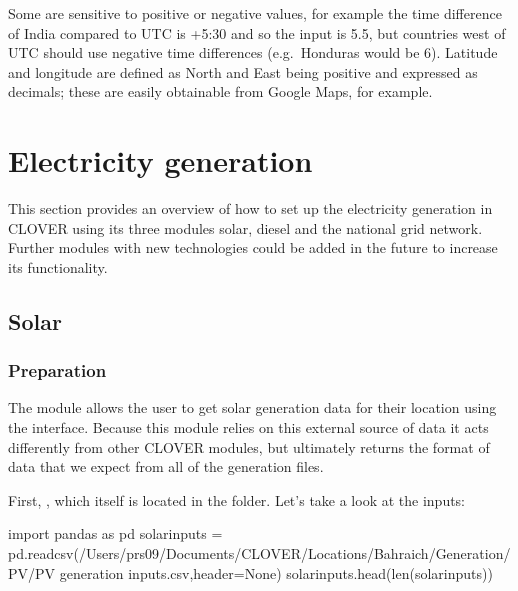 \documentclass[letterpaper,10pt,english]{sphinxmanual}
\begin{document}
\sphinxAtStartPar
Some are sensitive to positive or negative values, for example the time
difference of India compared to UTC is +5:30 and so the input is 5.5,
but countries west of UTC should use negative time differences
(e.g. Honduras would be \sphinxhyphen{}6). Latitude and longitude are defined as North
and East being positive and expressed as decimals; these are easily
obtainable from Google Maps, for example.


\section{Electricity generation}
\label{\detokenize{electricity_generation:electricity-generation}}\label{\detokenize{electricity_generation::doc}}
\sphinxAtStartPar
This section provides an overview of how to set up the electricity
generation in CLOVER using its three modules solar, diesel and the
national grid network. Further modules with new technologies could be
added in the future to increase its functionality.


\subsection{Solar}
\label{\detokenize{electricity_generation:solar}}

\subsubsection{Preparation}
\label{\detokenize{electricity_generation:preparation}}
\sphinxAtStartPar
The  module allows the user to get solar generation data for
their location using the  interface. Because this
module relies on this external source of data it acts differently from
other CLOVER modules, but ultimately returns the format of data that we
expect from all of the generation files.

\sphinxAtStartPar
First, , which itself is located in the  folder. Let’s take
a look at the inputs:

\begin{sphinxVerbatim}[commandchars=\\\{\}]
import pandas as pd
solar\PYGZus{}inputs = pd.read\PYGZus{}csv(\PYGZdq{}/Users/prs09/Documents/CLOVER/Locations/Bahraich/Generation/PV/PV generation inputs.csv\PYGZdq{},header=None)
solar\PYGZus{}inputs.head(len(solar\PYGZus{}inputs))
\end{sphinxVerbatim}
\end{document}
